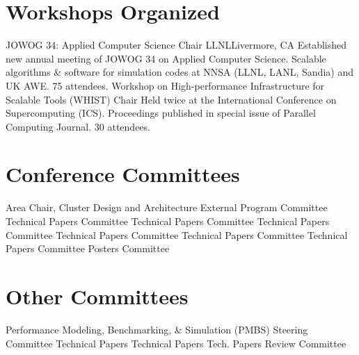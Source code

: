 \section{Workshops Organized}
		{JOWOG 34: Applied Computer Science}
		{Chair}
		{LLNL}{Livermore, CA}
		{Established new annual meeting of JOWOG 34 on Applied
		 Computer Science. Scalable algorithms \& software for
		 simulation codes at NNSA (LLNL, LANL, Sandia) and
		 UK AWE.  75 attendees.}
		{Workshop on High-performance Infrastructure for Scalable Tools (WHIST)}
		{Chair}{}{}
		{Held twice at the International Conference on Supercomputing (ICS).
		 Proceedings published in special issue of Parallel Computing
		 Journal. 30 attendees.}


\section{Conference Committees}
		{Area Chair, Cluster Design and Architecture}{}{}{}
		{External Program Committee}{}{}{}
		{Technical Papers Committee}{}{}{}
		{Technical Papers Committee}{}{}{}
		{Technical Papers Committee}{}{}{}
		{Technical Papers Committee}{}{}{}
		{Technical Papers Committee}{}{}{}
		{Technical Papers Committee}{}{}{}
		{Posters Committee}{}{}{}
	
\section{Other Committees}
		{Performance Modeling, Benchmarking, \& Simulation (PMBS)}
		{Steering Committee}{}{}{}
		{Technical Papers}{}{}{}
		{Technical Papers}{}{}{}
		{Tech. Papers}{}{}{}
		{Review Committee}{}{}{}

